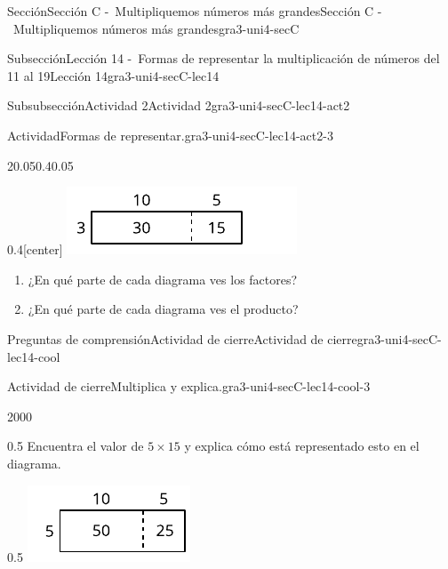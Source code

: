 \documentclass[twoside,10pt,]{article}
\begin{document}
\begin{sectionptx}{Sección}{Sección C -~Multipliquemos números más grandes}{}{Sección C -~Multipliquemos números más grandes}{}{}{gra3-uni4-secC}
\begin{subsectionptx}{Subsección}{Lección 14 -~Formas de representar la multiplicación de números del 11 al 19}{}{Lección 14}{}{}{gra3-uni4-secC-lec14}
\begin{subsubsectionptx}{Subsubsección}{Actividad 2}{}{Actividad 2}{}{}{gra3-uni4-secC-lec14-act2}
\begin{activity}{Actividad}{Formas de representar.}{gra3-uni4-secC-lec14-act2-3}
\begin{sidebyside}{2}{0.05}{0.4}{0.05}
\begin{sbspanel}{0.4}[center]
\includegraphics[width=\linewidth]{external/svg-source/tikz-file-147553.pdf}
\end{sbspanel}%
\end{sidebyside}%
%
\begin{enumerate}
\item{}¿En qué parte de cada diagrama ves los factores?%
\item{}¿En qué parte de cada diagrama ves el producto?%
\end{enumerate}
\end{activity}%
\end{subsubsectionptx}
%
%
\typeout{************************************************}
\typeout{************************************************}
%
\begin{reading-questions-subsubsection}{Preguntas de comprensión}{Actividad de cierre}{}{Actividad de cierre}{}{}{gra3-uni4-secC-lec14-cool}
\begin{project}{Actividad de cierre}{Multiplica y explica.}{gra3-uni4-secC-lec14-cool-3}%
\begin{sidebyside}{2}{0}{0}{0}%
\begin{sbspanel}{0.5}%
Encuentra el valor de \(5\times 15\) y explica cómo está representado esto en el diagrama.%
\end{sbspanel}%
\begin{sbspanel}{0.5}%
\includegraphics[width=\linewidth]{external/svg-source/tikz-file-147479.pdf}
\end{sbspanel}%

\end{sidebyside}
\end{project}
\end{reading-questions-subsubsection}
\end{subsectionptx}
\end{sectionptx}
\end{document}
